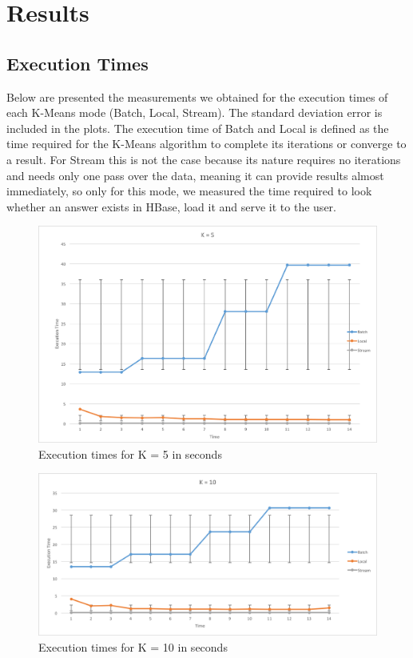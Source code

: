 \documentclass{lmproj}
\begin{document}
\section{Results}
\label{evaluation}

\subsection{Execution Times}
Below are presented the measurements we obtained for the execution times of each K-Means mode (Batch, Local, Stream). The standard deviation error is included in the plots. The execution time of Batch and Local is defined as the time required for the K-Means algorithm to complete its iterations or converge to a result. For Stream this is not the case because its nature requires no iterations and needs only one pass over the data, meaning it can provide results almost immediately, so only for this mode, we measured the time required to look whether an answer exists in HBase, load it and serve it to the user.

\bigskip

\begin{figure}[H]
	\centering	
	\includegraphics[scale=0.5]{execution_time/execution_time_k_5}
	\caption{Execution times for K = 5 in seconds}
\end{figure}

\begin{figure}[H]
	\centering	
	\includegraphics[scale=0.5]{execution_time/execution_time_k_10}
	\caption{Execution times for K = 10 in seconds}
\end{figure}
\end{document}
